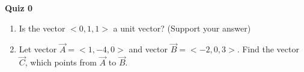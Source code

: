 \documentclass{article}
\begin{document}
\fancyfoot[C]{\thepage}
\vspace*{0cm}
\begin{center}
	{\LARGE \textbf{Quiz 0}}
\end{center}

\begin{enumerate}
	\item Is the vector $<0,1,1>$ a unit vector? (Support your answer)
	\vspace{8cm}
	\item Let vector $\vec{A} = <1,-4,0>$ and vector $\vec{B}=<-2,0,3>$. Find the vector $\vec{C}$, which points from $\vec{A}$ to $\vec{B}$.
\end{enumerate}
\end{document}
